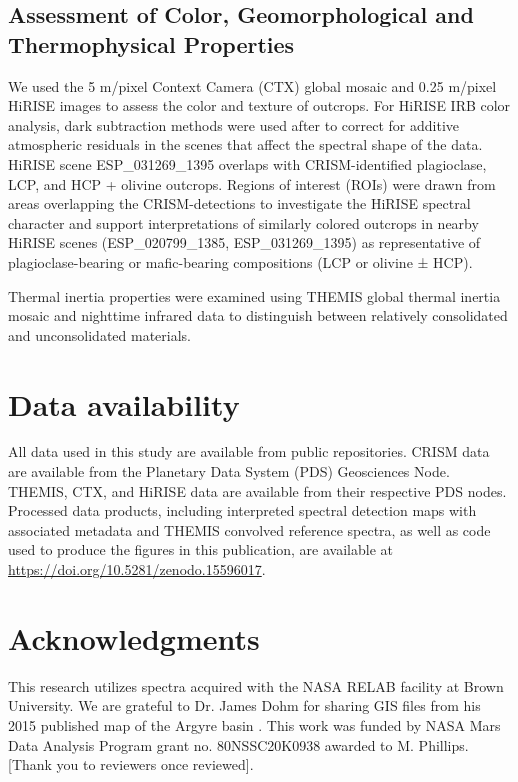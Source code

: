 \documentclass[12pt]{article}
\begin{document}
\subsection*{Assessment of Color, Geomorphological and Thermophysical Properties}

We used the 5 m/pixel Context Camera (CTX) global mosaic \citep{Malin2007, Dickson2018} and 0.25 m/pixel HiRISE images \citep{McEwen2010} to assess the color and texture of outcrops. For HiRISE IRB color analysis, dark subtraction methods were used after \citet{Tornabene2018} to correct for additive atmospheric residuals in the scenes that affect the spectral shape of the data. HiRISE scene ESP\_031269\_1395 overlaps with CRISM-identified plagioclase, LCP, and HCP + olivine outcrops. Regions of interest (ROIs) were drawn from areas overlapping the CRISM-detections to investigate the HiRISE spectral character and support interpretations of similarly colored outcrops in nearby HiRISE scenes (ESP\_020799\_1385, ESP\_031269\_1395) as representative of plagioclase-bearing or mafic-bearing compositions (LCP or olivine ± HCP).

Thermal inertia properties were examined using THEMIS global thermal inertia mosaic \citep{Fergason2006, Edwards2009} and nighttime infrared data \citep{Edwards2011} to distinguish between relatively consolidated and unconsolidated materials.

\section*{Data availability}

All data used in this study are available from public repositories. CRISM data are available from the Planetary Data System (PDS) Geosciences Node. THEMIS, CTX, and HiRISE data are available from their respective PDS nodes. Processed data products, including interpreted spectral detection maps with associated metadata and THEMIS convolved reference spectra, as well as code used to produce the figures in this publication, are available at \href{https://doi.org/10.5281/zenodo.15596017}{https://doi.org/10.5281/zenodo.15596017}.

\section*{Acknowledgments}

This research utilizes spectra acquired with the NASA RELAB facility at Brown University. We are grateful to Dr. James Dohm for sharing GIS files from his 2015 published map of the Argyre basin \citep{Dohm2015}. This work was funded by NASA Mars Data Analysis Program grant no. 80NSSC20K0938 awarded to M. Phillips. [Thank you to reviewers once reviewed].
\end{document}
